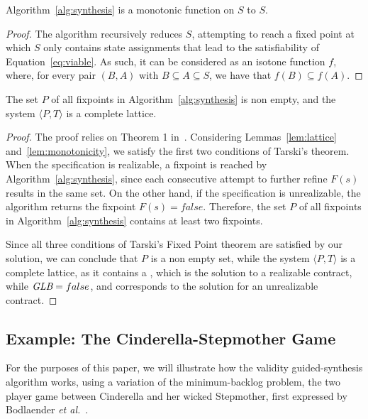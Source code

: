 \begin{lemma} Algorithm~\ref{alg:synthesis} is a monotonic function on $S$ to
$S$.
\label{lem:monotonicity}
\end{lemma}
\begin{proof}
The algorithm recursively reduces $S$, attempting to reach a fixed point
at which $S$ only contains state assignments that lead to the satisfiability of
Equation~\ref{eq:viable}. As such, it can be considered as an isotone function
$f$, where, for every pair $(B,A)$ with $B \subseteq A \subseteq S$, we have that
$f(B) \subseteq f(A)$.
\end{proof}

\begin{theorem}
The set $P$ of all fixpoints in Algorithm~\ref{alg:synthesis} is non
empty, and the system $\langle P, T \rangle$ is a complete lattice.
\label{thm:fixpoint}
\end{theorem}
\begin{proof}
The proof relies on Theorem 1 in~\cite{tarski1955lattice}. Considering
Lemmas~\ref{lem:lattice} and~\ref{lem:monotonicity}, we satisfy the first two
conditions of Tarski's theorem. When the specification is realizable, a
fixpoint is reached by Algorithm~\ref{alg:synthesis}, since each consecutive
attempt to further refine $F(s)$ results in the same set. On the other hand, if
the specification is unrealizable, the algorithm returns the fixpoint $F(s) = false$. Therefore, the
set $P$ of all fixpoints in Algorithm~\ref{alg:synthesis} contains at least two
fixpoints.

Since all three conditions of Tarski's Fixed Point theorem are satisfied by our
solution, we can conclude that $P$ is a non empty set, while the system
$\langle P, T \rangle$ is a complete lattice, as it contains a \lub, which is
the solution to a realizable contract, while $\textit {GLB} = false$, and corresponds to
the solution for an unrealizable contract.
\end{proof}


\subsection{Example: The Cinderella-Stepmother Game}
\label{sec:example}

For the purposes of this paper, we will illustrate how the validity
guided-synthesis algorithm works, using a variation of the minimum-backlog
problem, the two player game between Cinderella and her wicked
Stepmother, first  expressed by Bodlaender \textit{et
al.}~\cite{bodlaender2012cinderella}.

